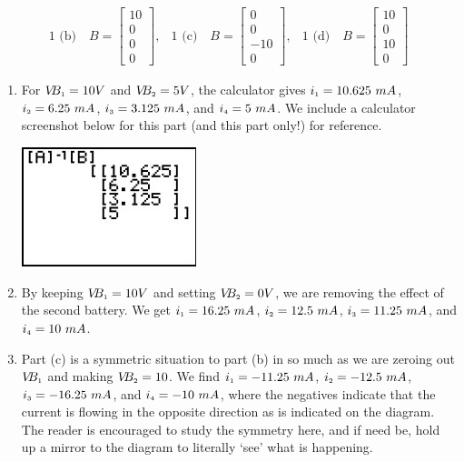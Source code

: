 \begin{ex}
\begin{enumerate}
\[\begin{array}{cccc}
\text{1 (b)} \quad B = \left[ \begin{array}{r} 10 \\ 0 \\ 0 \\ 0 \end{array} \right], & 

\text{1 (c)} \quad B = \left[ \begin{array}{r} 0 \\ 0 \\ -10 \\ 0 \end{array} \right], & 

\text{1 (d)} \quad B = \left[ \begin{array}{r} 10 \\ 0 \\ 10 \\ 0 \end{array} \right] 

\end{array} \]

\begin{enumerate}

\item  For $V\!\!B_{\mbox{\tiny$1$}} = 10 V$ and $V\!\!B_{\mbox{\tiny$2$}} = 5 V$, the calculator gives $i_{\mbox{\tiny$1$}} = 10.625 \, \, mA$, $i_{\mbox{\tiny$2$}} = 6.25 \, \, mA$, $i_{\mbox{\tiny$3$}} = 3.125 \, \, mA$, and $i_{\mbox{\tiny$4$}} = 5 \, \, mA$.  We include a calculator screenshot below for this part (and this part only!) for reference.


\centerline{\includegraphics[width=2in]{./MatricesGraphics/MATRIXINVERSE03.jpg}}


\item  By keeping  $V\!\!B_{\mbox{\tiny$1$}} = 10 V$ and setting $V\!\!B_{\mbox{\tiny$2$}} = 0 V$, we are removing the effect of the second battery. We get $i_{\mbox{\tiny$1$}} = 16.25 \, \, mA$, $i_{\mbox{\tiny$2$}} = 12.5 \, \, mA$, $i_{\mbox{\tiny$3$}} = 11.25 \, \, mA$, and $i_{\mbox{\tiny$4$}} = 10 \, \, mA$.  


\item  Part (c) is a symmetric situation to part (b) in so much as we are zeroing out $V\!\!B_{\mbox{\tiny$1$}}$ and making $V\!\!B_{\mbox{\tiny$2$}} = 10$.  We find $i_{\mbox{\tiny$1$}} = -11.25 \, \, mA$, $i_{\mbox{\tiny$2$}} = -12.5 \, \, mA$, $i_{\mbox{\tiny$3$}} = -16.25 \, \, mA$, and $i_{\mbox{\tiny$4$}} = -10 \, \, mA$, where the negatives indicate that the current is flowing in the opposite direction as is indicated on the diagram. The reader is encouraged to study the symmetry here, and if need be, hold up a mirror to the diagram to literally `see' what is happening.


\end{enumerate}
\end{enumerate}
\end{ex}
